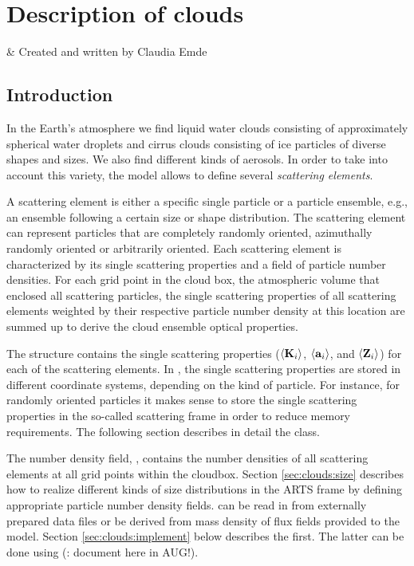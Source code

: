 \graphicspath{{Figs/clouds/}}

\chapter{Description of clouds}
 \label{sec:clouds}

 & Created and written by Claudia Emde\\ 
\stophistory

\section{Introduction}
\label{sec:clouds:intro}

In the Earth's atmosphere we find liquid water clouds consisting of
approximately spherical water droplets and cirrus clouds consisting of
ice particles of diverse shapes and sizes. We also find different
kinds of aerosols. In order to take into account this variety, the
model allows to define several \emph{scattering elements}.

A scattering element is either a specific single particle or a particle
ensemble, e.g., an ensemble following a certain size or shape distribution. The
scattering element can represent particles that are completely randomly
oriented, azimuthally randomly oriented or arbitrarily oriented. Each scattering
element is characterized by its single scattering properties and a field of
particle number densities.
For each grid point in the cloud box, the atmospheric volume that enclosed all
scattering particles, the single scattering properties of all scattering
elements weighted by their respective particle number density at this location
are summed up to derive the cloud ensemble optical properties.

The  structure contains the single scattering properties
($\langle{\bf K}_i\rangle$, $\langle{\bf a}_i\rangle$, and
$\langle{\bf Z}_i\rangle$) for each of the scattering elements. 
In , the single scattering properties are stored in
different coordinate systems, depending on the kind of particle. For instance, for
randomly oriented particles it makes sense to store the single scattering
properties in the so-called scattering frame in order to reduce memory
requirements. The following section describes in detail the
 class.

The number density field, , contains the number densities
of all scattering elements at all grid points within the cloudbox. Section
\ref{sec:clouds:size} describes how to realize different kinds of size distributions in the
ARTS frame by defining appropriate particle number density fields.
 can be read in from externally prepared data files or be
derived from mass density of flux fields provided to the model. Section
\ref{sec:clouds:implement} below describes the first. The latter can be done
using  (\FIXME: document here in AUG!).


